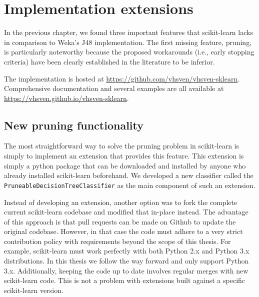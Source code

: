 \chapter{Implementation extensions}\label{cha:software_new}
In the previous chapter, we found three important features that scikit-learn lacks in comparison to Weka's J48 implementation. The first missing feature, pruning, is particularly noteworthy because the proposed workarounds (i.e., early stopping criteria) have been clearly established in the literature to be inferior.


The implementation is hosted at \url{https://github.com/vhsven/vhsven-sklearn}. Comprehensive documentation and several examples are all available at \url{https://vhsven.github.io/vhsven-sklearn}.

\section{New pruning functionality}
The most straightforward way to solve the pruning problem in scikit-learn is simply to implement an extension that provides this feature. This extension is simply a python package that can be downloaded and installed by anyone who already installed scikit-learn beforehand. We developed a new classifier called the \texttt{PruneableDecisionTreeClassifier} as the main component of such an extension. 

Instead of developing an extension, another option was to fork the complete current scikit-learn codebase and modified that in-place instead. The advantage of this approach is that pull requests can be made on Github to update the original codebase. However, in that case the code must adhere to a very strict contribution policy with requirements beyond the scope of this thesis. For example, scikit-learn must work perfectly with both Python 2.x and Python 3.x distributions. In this thesis we follow the way forward and only support Python 3.x. Additionally, keeping the code up to date involves regular merges with new scikit-learn code. This is not a problem with extensions built against a specific scikit-learn version.

